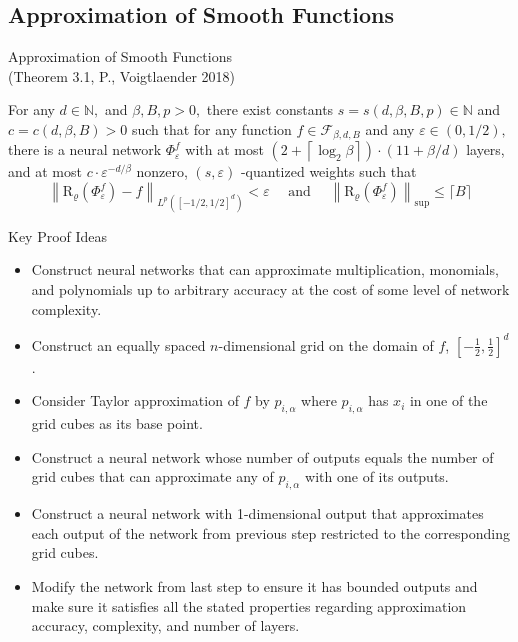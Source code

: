 \documentclass{if-beamer}
\begin{document}
\subsection{Approximation of Smooth Functions}
\begin{frame}{Approximation of Smooth Functions \\(Theorem 3.1, P., Voigtlaender 2018)}
    \begin{tcolorbox}
        For any $d \in \mathbb{N},$ and $\beta, B, p>0,$ there exist constants $s=s(d, \beta, B, p) \in \mathbb{N}$ and $c=c(d, \beta, B)>0$ such that for any function $f \in \mathcal{F}_{\beta, d, B}$ and any $\varepsilon \in(0,1 / 2),$ there is a neural network $\Phi_{\varepsilon}^{f}$ with at most $\left(2+\left\lceil\log _{2} \beta\right\rceil\right) \cdot(11+\beta / d)$ layers, and at most $c \cdot \varepsilon^{-d / \beta}$ nonzero, $(s, \varepsilon)$ -quantized weights such that {\small
        \[
        \left\|\mathrm{R}_{\varrho}\left(\Phi_{\varepsilon}^{f}\right)-f\right\|_{L^{p}\left([-1 / 2,1 / 2]^{d}\right)}<\varepsilon \quad \text { and } \quad\left\|\mathrm{R}_{\varrho}\left(\Phi_{\varepsilon}^{f}\right)\right\|_{\mathrm{sup}} \leq\lceil B\rceil
        \]
        }
    \end{tcolorbox}
\end{frame}

\begin{frame}{Key Proof Ideas}
    \begin{itemize}
        \item Construct neural networks that can approximate multiplication, monomials, and polynomials up to arbitrary accuracy at the cost of some level of network complexity.
        \item Construct an equally spaced $n$-dimensional grid on the domain of $f$, $[-\frac{1}{2}, \frac{1}{2}]^d$.
        \item Consider Taylor approximation of $f$ by $p_{i,\alpha}$ where $p_{i,\alpha}$ has $x_i$ in one of the grid cubes as its base point. 
        \item Construct a neural network whose number of outputs equals the number of grid cubes that can approximate any of $p_{i,\alpha}$ with one of its outputs.
        \item Construct a neural network with 1-dimensional output that approximates each output of the network from previous step restricted to the corresponding grid cubes.
        \item Modify the network from last step to ensure it has bounded outputs and make sure it satisfies all the stated properties regarding approximation accuracy, complexity, and number of layers.
    \end{itemize}
\end{frame}
\end{document}
